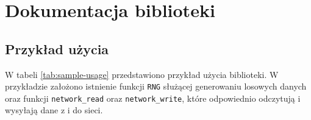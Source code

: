 \chapter{Dokumentacja biblioteki}
\label{app:docs}
\section{Przykład użycia}



W tabeli \ref{tab:sample-usage} przedstawiono przykład użycia biblioteki. W przykładzie założono istnienie funkcji \texttt{RNG} służącej generowaniu losowych danych oraz funkcji \texttt{network\_read} oraz \texttt{network\_write}, które odpowiednio odczytują i wysyłają dane z i do sieci.

